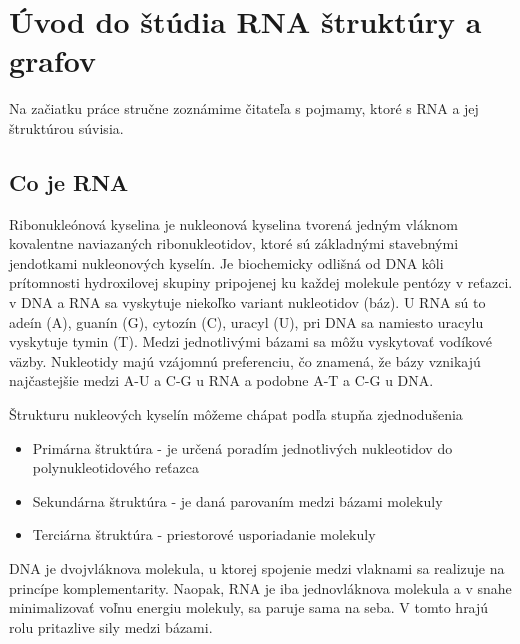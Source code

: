 \renewcommand{\SS}{\mathbb{S}}
\newcommand{\Par}[2]{\mbox{$( #1, #2 )$}}
\usetikzlibrary{positioning, shapes, trees, graphs} %
\newcommand{\scale}{0.6}

\newcommand{\tree}[1]{\ensuremath{#1}}

\chapter{Úvod do štúdia RNA štruktúry a grafov}

Na začiatku práce stručne zoznámime čitateľa s pojmamy, ktoré s RNA a jej štruktúrou súvisia.


\section{Co je RNA}

 
 Ribonukleónová kyselina je nukleonová kyselina tvorená jedným vláknom kovalentne naviazaných ribonukleotidov, 
 ktoré sú základnými stavebnými jendotkami nukleonových kyselín. Je biochemicky odlišná od DNA kôli prítomnosti 
 hydroxilovej skupiny pripojenej ku každej molekule pentózy v reťazci.
 v DNA a RNA sa vyskytuje niekoľko variant nukleotidov (báz). U RNA sú to
adeín (A), guanín (G), cytozín (C), uracyl (U),
pri DNA sa namiesto uracylu vyskytuje tymin (T).
Medzi jednotlivými bázami sa môžu vyskytovať vodíkové väzby. Nukleotidy majú
vzájomnú preferenciu, čo znamená, že bázy vznikajú najčastejšie medzi A-U a C-G
u RNA a podobne A-T a C-G u DNA.

Štrukturu nukleových kyselín môžeme chápat podľa stupňa zjednodušenia
\begin{itemize}
  \item Primárna štruktúra - je určená poradím jednotlivých nukleotidov
    do polynukleotidového reťazca
  \item Sekundárna štruktúra - je daná parovaním medzi bázami molekuly
  \item Terciárna štruktúra - priestorové usporiadanie molekuly
\end{itemize}
DNA je dvojvláknova molekula, u ktorej spojenie medzi vlaknami sa realizuje na princípe
komplementarity.
Naopak, RNA je iba jednovláknova molekula a v snahe minimalizovať voľnu energiu molekuly,
sa paruje sama na seba. V tomto hrajú rolu pritazlive sily medzi bázami.


